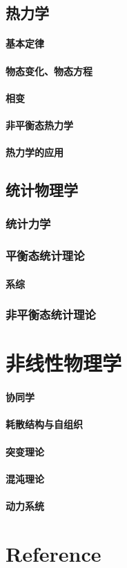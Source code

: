 \documentclass[UTF8]{../06-Physics}
\begin{document}
\section{热力学}
    \subsubsection{基本定律}
    \subsubsection{物态变化、物态方程}
    \subsubsection{相变}
    \subsubsection{非平衡态热力学}
    \subsubsection{热力学的应用}
\section{统计物理学}
    \subsection{统计力学}
    \subsection{平衡态统计理论}
        \subsubsection{系综}
    \subsection{非平衡态统计理论}



\chapter{非线性物理学}
    \subsubsection{协同学}
    \subsubsection{耗散结构与自组织}
    \subsubsection{突变理论}
    \subsubsection{混沌理论}
    \subsubsection{动力系统}


\chapter{Reference}
\end{document}
